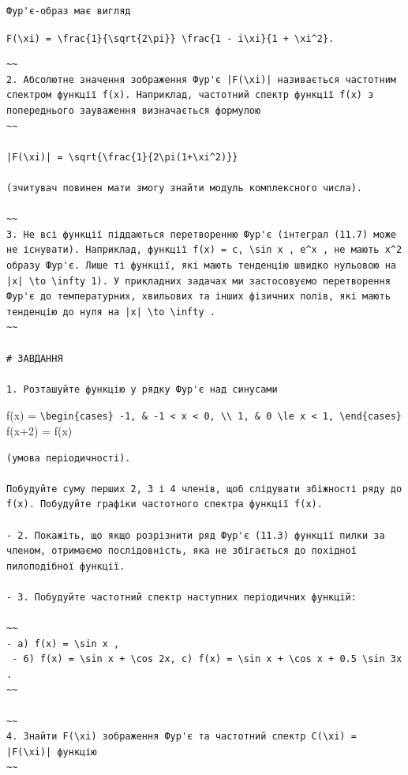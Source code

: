 \documentclass[
  ukrainian,
]{article}
\begin{document}
\begin{verbatim}
Фур'є-образ має вигляд
\end{verbatim}

\texttt{F(\textbackslash{}xi)\ =\ \textbackslash{}frac\{1\}\{\textbackslash{}sqrt\{2\textbackslash{}pi\}\}\ \textbackslash{}frac\{1\ -\ i\textbackslash{}xi\}\{1\ +\ \textbackslash{}xi\^{}2\}.}

\begin{verbatim}
~~
2. Абсолютне значення зображення Фур'є |F(\xi)| називається частотним спектром функції f(x). Наприклад, частотний спектр функції f(x) з попереднього зауваження визначається формулою
~~

|F(\xi)| = \sqrt{\frac{1}{2\pi(1+\xi^2)}}

(зчитувач повинен мати змогу знайти модуль комплексного числа).

~~
3. Не всі функції піддаються перетворенню Фур'є (інтеграл (11.7) може не існувати). Наприклад, функції f(x) = c, \sin x , e^x , не мають x^2 образу Фур'є. Лише ті функції, які мають тенденцію швидко нульовою на |x| \to \infty 1). У прикладних задачах ми застосовуємо перетворення Фур'є до температурних, хвильових та інших фізичних полів, які мають тенденцію до нуля на |x| \to \infty .
~~

# ЗАВДАННЯ

1. Розташуйте функцію у рядку Фур'є над синусами
\end{verbatim}

f(x) =
\texttt{\textbackslash{}begin\{cases\}\ -1,\ \&\ -1\ \textless{}\ x\ \textless{}\ 0,\ \textbackslash{}\textbackslash{}\ 1,\ \&\ 0\ \textbackslash{}le\ x\ \textless{}\ 1,\ \textbackslash{}end\{cases\}}
f(x+2) = f(x)

\begin{verbatim}
(умова періодичності).

Побудуйте суму перших 2, 3 і 4 членів, щоб слідувати збіжності ряду до f(x). Побудуйте графіки частотного спектра функції f(x).

- 2. Покажіть, що якщо розрізнити ряд Фур'є (11.3) функції пилки за членом, отримаємо послідовність, яка не збігається до похідної пилоподібної функції.

- 3. Побудуйте частотний спектр наступних періодичних функцій:

~~
- a) f(x) = \sin x ,
 - 6) f(x) = \sin x + \cos 2x, c) f(x) = \sin x + \cos x + 0.5 \sin 3x .
~~

~~
4. Знайти F(\xi) зображення Фур'є та частотний спектр C(\xi) = |F(\xi)| функцію
~~
\end{verbatim}
\end{document}
